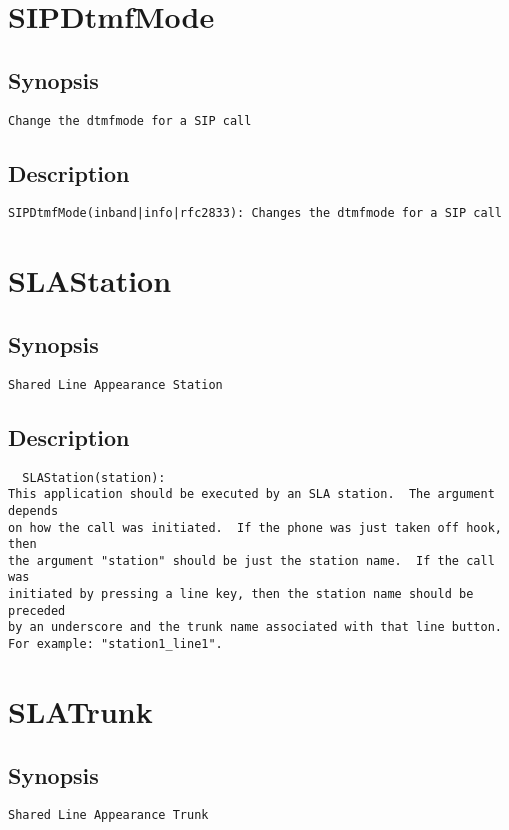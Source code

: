 \section{SIPDtmfMode}
\subsection{Synopsis}
\begin{verbatim}
Change the dtmfmode for a SIP call
\end{verbatim}
\subsection{Description}
\begin{verbatim}
SIPDtmfMode(inband|info|rfc2833): Changes the dtmfmode for a SIP call

\end{verbatim}


\section{SLAStation}
\subsection{Synopsis}
\begin{verbatim}
Shared Line Appearance Station
\end{verbatim}
\subsection{Description}
\begin{verbatim}
  SLAStation(station):
This application should be executed by an SLA station.  The argument depends
on how the call was initiated.  If the phone was just taken off hook, then
the argument "station" should be just the station name.  If the call was
initiated by pressing a line key, then the station name should be preceded
by an underscore and the trunk name associated with that line button.
For example: "station1_line1".
\end{verbatim}


\section{SLATrunk}
\subsection{Synopsis}
\begin{verbatim}
Shared Line Appearance Trunk
\end{verbatim}

